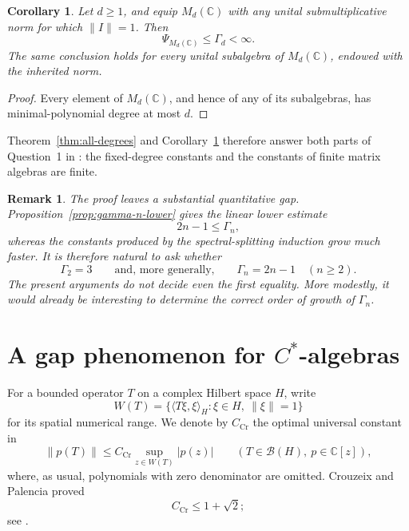 \documentclass[10pt,a4paper]{amsart}
\newtheorem{corollary}[theorem]{Corollary}
\newtheorem{remark}[theorem]{Remark}
\newcommand{\C}{\mathbb C}
\newcommand{\calB}{\mathcal B}
\begin{document}
\begin{corollary}\label{cor:matrix-algebras}
Let \(d\geqslant1\), and equip \(M_d(\C)\) with any unital submultiplicative norm for which \(\|I\|=1\).  Then
\[
       \Psi_{M_d(\C)}\leqslant\Gamma_d<\infty.
\]
The same conclusion holds for every unital subalgebra of \(M_d(\C)\),
endowed with the inherited norm.
\end{corollary}

\begin{proof}
Every element of \(M_d(\C)\), and hence of any of its subalgebras, has minimal-polynomial degree at most \(d\).
\end{proof}

Theorem~\ref{thm:all-degrees} and Corollary~\ref{cor:matrix-algebras} therefore answer both parts of Question~1 in \cite[Section~8]{BHDVW}: the fixed-degree constants and the constants of finite matrix algebras are finite.

\begin{remark}\label{rem:quantitative-gap}
The proof leaves a substantial quantitative gap.  Proposition~\ref{prop:gamma-n-lower}
gives the linear lower estimate
\[
       2n-1\leqslant\Gamma_n,
\]
whereas the constants produced by the spectral-splitting induction grow much
faster.  It is therefore natural to ask whether
\[
       \Gamma_2=3
       \qquad\text{and, more generally,}\qquad
       \Gamma_n=2n-1\quad(n\geqslant2).
\]
The present arguments do not decide even the first equality.  More modestly,
it would already be interesting to determine the correct order of growth of
\(\Gamma_n\).
\end{remark}

\section{A gap phenomenon for \texorpdfstring{\(C^*\)}{C-star}-algebras}\label{sec:cstar-gap}

For a bounded operator \(T\) on a complex Hilbert space \(H\), write
\[
       W(T)=\{\langle T\xi,\xi\rangle_H:\xi\in H,\ \|\xi\|=1\}
\]
for its spatial numerical range.  We denote by \(C_{\mathrm{Cr}}\) the optimal
universal constant in
\[
       \|p(T)\|\leqslant C_{\mathrm{Cr}}
       \sup_{z\in W(T)}|p(z)|
       \qquad(T\in\calB(H),\ p\in\C[z]),
\]
where, as usual, polynomials with zero denominator are omitted.  Crouzeix and
Palencia proved
\begin{equation}\label{eq:crouzeix-palencia}
       C_{\mathrm{Cr}}\leqslant1+\sqrt2;
\end{equation}
see \cite[Theorem~3.1 and formula~(3)]{CrouzeixPalencia}.
\end{document}
